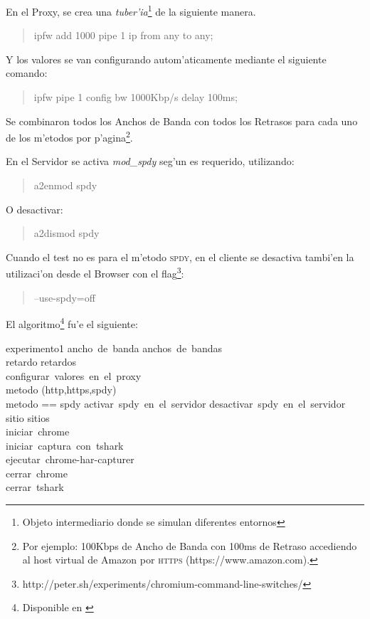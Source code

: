 \documentclass[a4paper,11pt,twocolumn]{article}
\begin{document}
En el Proxy, se crea una \emph{tuber'ia}\footnote{Objeto intermediario donde se simulan diferentes entornos} de la siguiente manera.

\begin{quote}\small
ipfw add 1000 pipe 1 ip from any to any;
\end{quote}

Y los valores se van configurando autom'aticamente mediante el siguiente comando:

\begin{quote}\small
ipfw pipe 1 config bw 1000Kbp/s delay 100ms;
\end{quote}

Se combinaron todos los Anchos de Banda con todos los Retrasos para cada uno de los m'etodos por p'agina\footnote{Por ejemplo: 100Kbps de Ancho de Banda con 100ms de Retraso accediendo al host virtual de Amazon por \textsc{https} (https://www.amazon.com).}.

En el Servidor se activa \emph{mod\_spdy} seg'un es requerido, utilizando:

\begin{quote}\small
a2enmod spdy
\end{quote}

O desactivar:

\begin{quote}\small
a2dismod spdy
\end{quote}

Cuando el test no es para el m'etodo \textsc{spdy}, en el cliente  se desactiva tambi'en la utilizaci'on desde el Browser con el flag\footnote{http://peter.sh/experiments/chromium-command-line-switches/}:

\begin{quote}\small
--use-spdy=off
\end{quote}

El algoritmo\footnote{Disponible en \cite[exp1.sh]{spdy-tests}} fu'e el siguiente:

\begin{pseudocode}{experimento1}{ }
\FOR ancho\ de\ banda \in anchos\ de\ bandas \DO \\
	\BEGIN
	\FOR retardo \in retardos \DO \\
		\BEGIN
			configurar\ valores\ en\ el\ proxy \\
			\FOR metodo \in (http,https,spdy) \DO \\
				\BEGIN
					\IF metodo == spdy
					\THEN
						activar\ spdy\ en\ el\ servidor
					\ELSE
						desactivar\ spdy\ en\ el\ servidor\\
					\FOR sitio \in sitios \DO \\
					\BEGIN
						iniciar\ chrome\\
						iniciar\ captura\ con\ tshark\\
						ejecutar\ chrome-har-capturer\\
						cerrar\ chrome\\
						cerrar\ tshark
					\END
				\END
		\END
	\END
\end{pseudocode}
\end{document}
